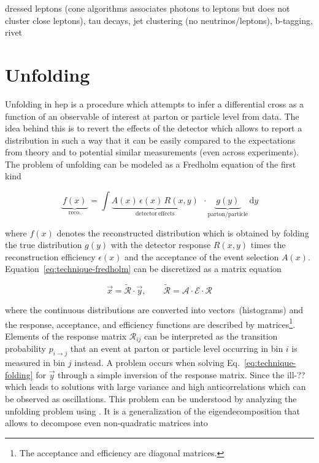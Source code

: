 dressed leptons (cone algorithms associates photons to leptons but does not cluster close leptons), tau decays, jet clustering (no neutrinos/leptons), b-tagging, rivet



\section{Unfolding}

Unfolding in \gls{hep} is a procedure which attempts to infer a differential cross as a function of an observable of interest at parton or particle level from data. The idea behind this is to revert the effects of the detector which allows to report a distribution in such a way that it can be easily compared to the expectations from theory and to potential similar measurements (even across experiments). The problem of unfolding can be modeled as a Fredholm equation of the first kind

\begin{equation}
\underbrace{~f(x)~}_\mathrm{reco.}=\int \underbrace{A(x)\,\epsilon(x)\, R(x,y)}_\mathrm{detector~effects}~~\cdot \underbrace{~g(y)~}_\mathrm{parton/particle}\, \mathrm{d}y \label{eq:technique-fredholm}
\end{equation}

where $f(x)$ denotes the reconstructed distribution which is obtained by folding the true distribution $g(y)$ with the detector response $R(x,y)$ times the reconstruction efficiency $\epsilon(x)$ and the acceptance of the event selection $A(x)$. Equation~\ref{eq:technique-fredholm} can be discretized as a matrix equation

\begin{equation}
\vec{x} = \widetilde{\mathcal{R}}\cdot\vec{y},\qquad \widetilde{\mathcal{R}}=\mathcal{A}\cdot\mathcal{E}\cdot\mathcal{R} \label{eq:technique-folding}
\end{equation}

where the continuous distributions are converted into vectors~(histograms) and the response, acceptance, and efficiency functions are described by matrices\footnote{The acceptance and efficiency are diagonal matrices.}. Elements of the response matrix $\mathcal{R}_{ij}$ can be interpreted as the transition probability $p_{i\to j}$ that an event at parton or particle level occurring in bin $i$ is measured in bin $j$ instead. A problem occurs when solving Eq.~\ref{eq:technique-folding} for $\vec{y}$ through a simple inversion of the response matrix. Since the ill-?? which leads to solutions with large variance and high anticorrelations which can be observed as oscillations. This problem can be understood by analyzing the unfolding problem using . It is a generalization of the eigendecomposition that allows to decompose even non-quadratic matrices into 

